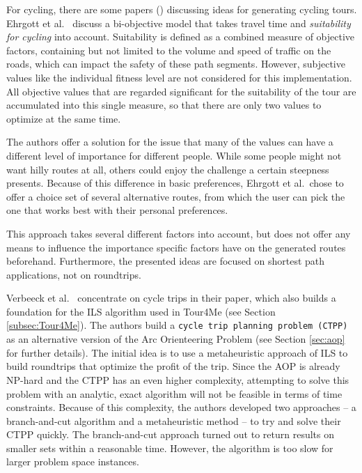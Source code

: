 For cycling, there are some papers (\cite{ehrgott_bi-objective_2012, verbeeck_extension_2014}) discussing ideas for generating cycling tours.
Ehrgott et al.\ \cite{ehrgott_bi-objective_2012}  discuss a bi-objective model that takes travel time and \textit{suitability for cycling} into account.
Suitability is defined as a combined measure of objective factors, containing but not limited to the volume and speed of traffic on the roads, which can impact the safety of these path segments. 
However, subjective values like the individual fitness level are not considered for this implementation.
All objective values that are regarded significant for the suitability of the tour are accumulated into this single measure, so that there are only two values to optimize at the same time. 

The authors offer a solution for the issue that many of the values can have a different level of importance for different people. 
While some people might not want hilly routes at all, others could enjoy the challenge a certain steepness presents. 
Because of this difference in basic preferences, Ehrgott et al.\ chose to offer a choice set of several alternative routes, from which the user can pick the one that works best with their personal preferences. 

This approach takes several different factors into account, but does not offer any means to influence the importance specific factors have on the generated routes beforehand.
Furthermore, the presented ideas are focused on shortest path applications, not on roundtrips.

Verbeeck et al.\ \cite{verbeeck_extension_2014} concentrate on cycle trips in their paper, which also builds a foundation for the ILS algorithm used in Tour4Me (see Section \ref{subsec:Tour4Me}). 
The authors build a \texttt{cycle trip planning problem (CTPP)} as an alternative version of the Arc Orienteering Problem (see Section \ref{sec:aop} for further details). 
The initial idea is to use a metaheuristic approach of ILS to build roundtrips that optimize the profit of the trip.
Since the AOP is already NP-hard and the CTPP has an even higher complexity, attempting to solve this problem with an analytic, exact algorithm will not be feasible in terms of time constraints. 
Because of this complexity, the authors developed two approaches -- a branch-and-cut algorithm and a metaheuristic method -- to try and solve their CTPP quickly. 
The branch-and-cut approach turned out to return results on smaller sets within a reasonable time.
However, the algorithm is too slow for larger problem space instances.

